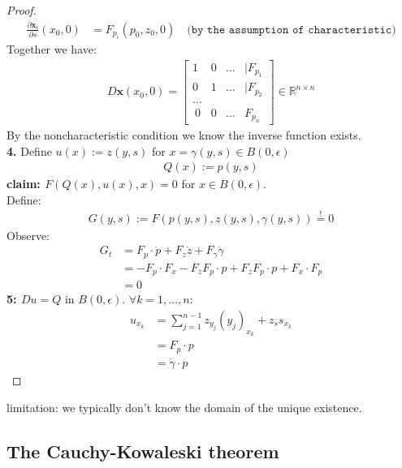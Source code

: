 \documentclass[a4paper,11pt,oneside,fleqn]{book}
\theoremstyle{definition}
\theoremstyle{remark}
\begin{document}
\begin{proof}
\begin{align*}
	\frac{\partial \textbf{x}_i }{\partial s}(x_0, 0) &= F_{p_i}(p_0, z_0, 0)
	\quad \texttt{(by the assumption of characteristic)}
\end{align*} 
Together we have:
\begin{align*}
D\textbf{x}(x_0, 0)= 
	\begin{bmatrix}
		1 & 0 & \dots &|F_{p_1}\\
		0 & 1 & \dots &|F_{p_2}\\
		\dots\\\
		0 & 0 & \dots & F_{p_n} 
	\end{bmatrix}
	\in \mathbb{R}^{n \times n}
\end{align*}
By the noncharacteristic condition we know the inverse function exists. \\
\textbf{4.} Define $u(x):= z(y, s)$ for $x = \gamma(y, s) \in B(0, \epsilon)$
\begin{align*}
	Q(x):= p(y, s)
\end{align*}
\textbf{claim: $F(Q(x), u(x), x) = 0$} for $x \in B(0, \epsilon)$. \\
Define:
\begin{align*}
	G(y,s):= F(p(y, s), z(y, s), \gamma(y, s)) \overset{!}{=} 0
\end{align*}
Observe:
\begin{align*}
	G_t &= F_p \cdot \dot{p} + F_z \dot{z} + F_\gamma \dot{\gamma}\\
		&= - F_p \cdot  F_x - F_z F_p \cdot p+ F_z F_p \cdot p + F_x \cdot F_p \\
		&= 0
\end{align*}
\textbf{5: $Du = Q$} in $B(0, \epsilon)$. $\forall k = 1, \dots, n$:
\begin{align*}
	u_{x_k} &= \sum_{j = 1}^{n - 1} z_{y_j} (y_j)_{x_k} + z_s s_{x_k}\\
	&= 
	F_p \cdot p\\
	&= 
	\dot{\gamma} \cdot p
\end{align*}

\end{proof}

limitation: we typically don't know the domain of the unique existence.


\subsection{The Cauchy-Kowaleski theorem}
\end{document}
